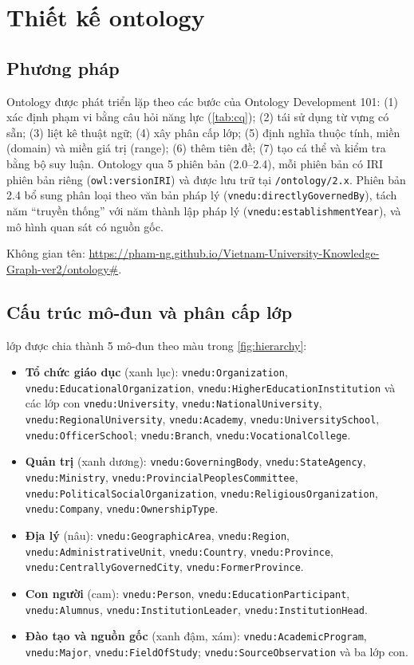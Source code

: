 \documentclass[12pt,a4paper]{article}
\newcommand{\vn}[1]{\texttt{vnedu:\allowbreak #1}}
\begin{document}
\section{Thiết kế ontology}\label{sec:ontology}

\subsection{Phương pháp}
Ontology được phát triển lặp theo các bước của Ontology Development 101: (1) xác định phạm vi bằng câu hỏi năng lực
(\cref{tab:cq}); (2) tái sử dụng từ vựng có sẵn; (3) liệt kê thuật ngữ; (4) xây phân cấp lớp; (5) định nghĩa thuộc
tính, miền (domain) và miền giá trị (range); (6) thêm tiên đề; (7) tạo cá thể và kiểm tra bằng bộ suy luận. Ontology
qua 5 phiên bản (2.0--2.4), mỗi phiên bản có IRI phiên bản riêng (\texttt{owl:versionIRI}) và được lưu trữ tại
\texttt{/ontology/2.x}. Phiên bản 2.4 bổ sung phân loại theo văn bản pháp lý (\vn{directlyGovernedBy}), tách năm
``truyền thống'' với năm thành lập pháp lý (\vn{establishmentYear}), và mô hình quan sát có nguồn gốc.

Không gian tên: \url{https://pham-ng.github.io/Vietnam-University-Knowledge-Graph-ver2/ontology#}.

\subsection{Cấu trúc mô-đun và phân cấp lớp}
\metricClasses{} lớp được chia thành 5 mô-đun theo màu trong \cref{fig:hierarchy}:
\begin{itemize}
  \item \textbf{Tổ chức giáo dục} (xanh lục): \vn{Organization}, \vn{EducationalOrganization},
  \vn{HigherEducationInstitution} và các lớp con \vn{University}, \vn{NationalUniversity}, \vn{RegionalUniversity},
  \vn{Academy}, \vn{UniversitySchool}, \vn{OfficerSchool}; \vn{Branch}, \vn{VocationalCollege}.
  \item \textbf{Quản trị} (xanh dương): \vn{GoverningBody}, \vn{StateAgency}, \vn{Ministry},
  \vn{ProvincialPeoplesCommittee}, \vn{PoliticalSocialOrganization}, \vn{ReligiousOrganization}, \vn{Company},
  \vn{OwnershipType}.
  \item \textbf{Địa lý} (nâu): \vn{GeographicArea}, \vn{Region}, \vn{AdministrativeUnit}, \vn{Country},
  \vn{Province}, \vn{CentrallyGovernedCity}, \vn{FormerProvince}.
  \item \textbf{Con người} (cam): \vn{Person}, \vn{EducationParticipant}, \vn{Alumnus}, \vn{InstitutionLeader},
  \vn{InstitutionHead}.
  \item \textbf{Đào tạo và nguồn gốc} (xanh đậm, xám): \vn{AcademicProgram}, \vn{Major}, \vn{FieldOfStudy};
  \vn{SourceObservation} và ba lớp con.
\end{itemize}
\end{document}
